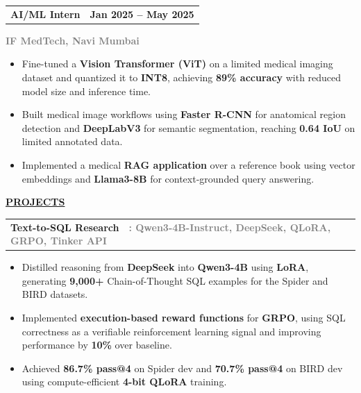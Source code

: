 \documentclass[a4paper,11pt]{article}
\makeatletter
\newcommand{\TitleText}[1]{\textbf{\large #1}}
\newcommand{\BlackBold}[1]{\textbf{#1}}
\newcommand{\GrayText}[1]{\textcolor{graytext}{\textbf{#1}}}
\newcommand{\SectionHeader}[1]{%
  \vspace{2mm}%
  \begin{center}
    {\large\textbf{\underline{#1}}}%
  \end{center}
  \vspace{-2mm}%
}
\newcommand{\ProjectLine}[4]{%
  \begin{tabularx}{\textwidth}{@{} X r @{}}
    {\TitleText{#1}\ \ \GrayText{: #2}} & {\small \href{#4}{\textcolor{linkblue}{#3}}} \\
  \end{tabularx}
}
\makeatother
\begin{document}
\vspace{3mm}

\begin{tabularx}{\textwidth}{@{} X r @{}}
  {\TitleText{AI/ML Intern}} & {\large \textbf{Jan 2025 -- May 2025}} \\
\end{tabularx}
\GrayText{IF MedTech, Navi Mumbai}\\[-3mm]
{\normalsize
\begin{itemize}
  \item Fine-tuned a \BlackBold{Vision Transformer (ViT)} on a limited medical imaging dataset and quantized it to \BlackBold{INT8}, achieving \BlackBold{89\% accuracy} with reduced model size and inference time.
  \item Built medical image workflows using \BlackBold{Faster R-CNN} for anatomical region detection and \BlackBold{DeepLabV3} for semantic segmentation, reaching \BlackBold{0.64 IoU} on limited annotated data.
  \item Implemented a medical \BlackBold{RAG application} over a reference book using vector embeddings and \BlackBold{Llama3-8B} for context-grounded query answering.
\end{itemize}
}

\SectionHeader{PROJECTS}

\ProjectLine{Text-to-SQL Research}{Qwen3-4B-Instruct, DeepSeek, QLoRA, GRPO, Tinker API}{}{}
{\normalsize
\begin{itemize}
  \item Distilled reasoning from \BlackBold{DeepSeek} into \BlackBold{Qwen3-4B} using \BlackBold{LoRA}, generating \BlackBold{9,000+} Chain-of-Thought SQL examples for the Spider and BIRD datasets.
  \item Implemented \BlackBold{execution-based reward functions} for \BlackBold{GRPO}, using SQL correctness as a verifiable reinforcement learning signal and improving performance by \BlackBold{10\%} over baseline.
  \item Achieved \BlackBold{86.7\% pass@4} on Spider dev and \BlackBold{70.7\% pass@4} on BIRD dev using compute-efficient \BlackBold{4-bit QLoRA} training.
\end{itemize}
}

\vspace{3mm}
\end{document}
